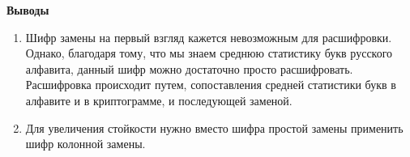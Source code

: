 \documentclass[a4paper,14pt]{extarticle}
\begin{document}
    \textbf{Выводы}
    \begin{enumerate}
        \item Шифр замены на первый взгляд кажется невозможным для расшифровки.
        Однако, благодаря тому, что мы знаем среднюю статистику букв русского алфавита,
        данный шифр можно достаточно просто расшифровать. Расшифровка происходит путем,
        сопоставления средней статистики букв в алфавите и в криптограмме, и последующей
        заменой.
        \item Для увеличения стойкости нужно вместо шифра простой замены применить шифр
        колонной замены.

    \end{enumerate}
\end{document}
